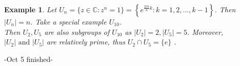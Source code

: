 \documentclass{article}
\theoremstyle{MyNonumberplain}
\theoremstyle{break}
\newcommand{\infixand}{\text{ and }}
\theoremstyle{break}
\newtheorem{example}{Example}[section]
\theoremstyle{break}
\theoremstyle{definition}
\theoremstyle{break}
\begin{document}
\begin{expbox}
    \begin{example}
        Let $U_n = \{ z \in \mathbb{C}: z^n = 1 \} = \left\{ e^{\frac{2 \pi i}{n} k} :
        k = 1, 2, \ldots, k - 1 \right\}$. Then $| U_n | = n$. Take a special example
        $U_{10}$.\\

        Then $U_2, U_5$ are also subgroups of $U_{10}$ as $| U_2 | = 2, | U_5 | = 5$.
        Moreover, $| U_2 | \infixand | U_5 |$ are relatively prime, thus $U_2 \cap U_5
        = \{ e \}$ . 
    \end{example}
\end{expbox}

-Oct 5 finished-
\end{document}
